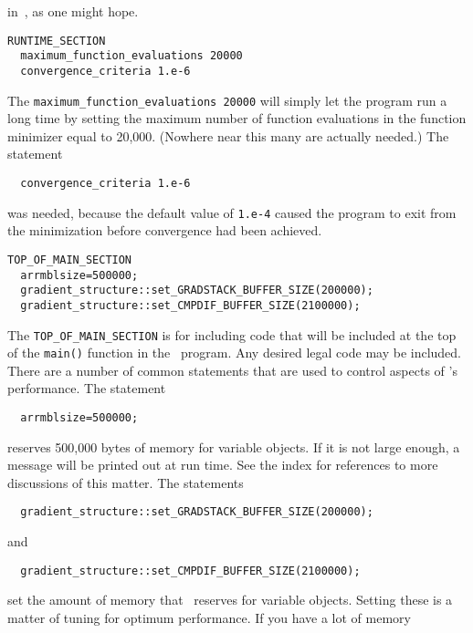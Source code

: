 \documentclass{admbmanual}
\begin{document}
in~\cite{hamilton1989}, as one might hope.
\begin{lstlisting}
RUNTIME_SECTION
  maximum_function_evaluations 20000
  convergence_criteria 1.e-6
\end{lstlisting}
The \texttt{maximum\_function\_evaluations 20000} will simply let the program
run a long time by setting the maximum number of function evaluations in the
function minimizer equal to 20,000. (Nowhere near this many are actually
needed.) The statement
\begin{lstlisting}
  convergence_criteria 1.e-6
\end{lstlisting}
was needed, because the default value of \texttt{1.e-4} caused the program to
exit from the minimization before convergence had been achieved.
%
{}
%
{}
\begin{lstlisting}
TOP_OF_MAIN_SECTION
  arrmblsize=500000;
  gradient_structure::set_GRADSTACK_BUFFER_SIZE(200000);
  gradient_structure::set_CMPDIF_BUFFER_SIZE(2100000);
\end{lstlisting}
The \texttt{TOP\_OF\_MAIN\_SECTION} is for including code that will be included
at the top of the \texttt{main()} function in the \cplus\ program. Any desired
legal code may be included. There are a number of common statements that are
used to control aspects of \ADM's performance. The statement
\begin{lstlisting}
  arrmblsize=500000;
\end{lstlisting}
reserves 500,000 bytes of memory for variable objects. If it is not large
enough, a message will be printed out at run time. See the index for references
to more discussions of this matter. The statements
\begin{lstlisting}
  gradient_structure::set_GRADSTACK_BUFFER_SIZE(200000);
\end{lstlisting}
and
\begin{lstlisting}
  gradient_structure::set_CMPDIF_BUFFER_SIZE(2100000);
\end{lstlisting}
set the amount of memory that \ADM\ reserves for variable objects. Setting these
is a matter of tuning for optimum performance. If you have a lot of memory
\end{document}
